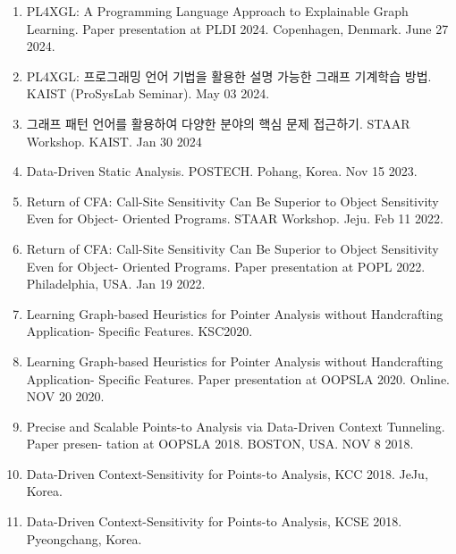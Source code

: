 \documentclass[letterpaper,11pt]{article}
\begin{document}
\begin{enumerate}
  \item{PL4XGL: A Programming Language Approach to Explainable Graph Learning. Paper presentation at PLDI 2024. Copenhagen, Denmark. June 27 2024.}
  
  \item{PL4XGL: 프로그래밍 언어 기법을 활용한 설명 가능한 그래프 기계학습 방법. KAIST (ProSysLab Seminar). May 03 2024.}
  
  \item{그래프 패턴 언어를 활용하여 다양한 분야의 핵심 문제 접근하기. STAAR Workshop. KAIST. Jan 30 2024}

  \item{Data-Driven Static Analysis. POSTECH. Pohang, Korea. Nov 15 2023.}

  \item{Return of CFA: Call-Site Sensitivity Can Be Superior to Object Sensitivity Even for Object- Oriented Programs. STAAR Workshop. Jeju. Feb 11 2022.}

  \item{Return of CFA: Call-Site Sensitivity Can Be Superior to Object Sensitivity Even for Object- Oriented Programs. Paper presentation at POPL 2022. Philadelphia,  USA. Jan 19 2022.}
 
  \item{Learning Graph-based Heuristics for Pointer Analysis without Handcrafting Application- Specific Features. KSC2020.}
 
  \item{Learning Graph-based Heuristics for Pointer Analysis without Handcrafting Application- Specific Features. Paper presentation at OOPSLA 2020. Online. NOV 20 2020.}
 
  \item{Precise and Scalable Points-to Analysis via Data-Driven Context Tunneling. Paper presen- tation at OOPSLA 2018. BOSTON, USA. NOV 8 2018.}
 
  \item{Data-Driven Context-Sensitivity for Points-to Analysis, KCC 2018. JeJu, Korea.}
 
  \item{Data-Driven Context-Sensitivity for Points-to Analysis, KCSE 2018. Pyeongchang, Korea.}
\end{enumerate}

\end{document}
